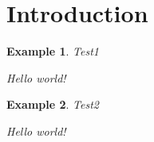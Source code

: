 \newtheorem{example}{Example}[section] %



\maketitle

\section{Introduction}

\begin{example}{Test1}

Hello world!

\end{example}

\begin{example}{Test2}

Hello world!

\end{example}



